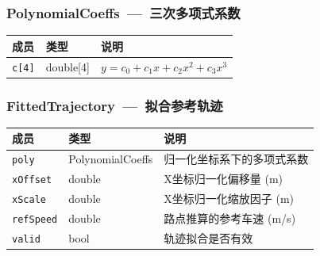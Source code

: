 \documentclass[a4paper,10pt]{article}
\begin{document}
\subsubsection{PolynomialCoeffs~---~三次多项式系数}
\begin{longtable}{|L{3.5cm}|C{2cm}|L{9.5cm}|}
\hline
\textbf{成员} & \textbf{类型} & \textbf{说明} \\
\hline
\texttt{c[4]} & double[4] & $y = c_0 + c_1 x + c_2 x^2 + c_3 x^3$ \\
\hline
\end{longtable}

\subsubsection{FittedTrajectory~---~拟合参考轨迹}
\begin{longtable}{|L{3.5cm}|C{2cm}|L{9.5cm}|}
\hline
\textbf{成员} & \textbf{类型} & \textbf{说明} \\
\hline
\texttt{poly} & PolynomialCoeffs & 归一化坐标系下的多项式系数 \\
\hline
\texttt{xOffset} & double & X坐标归一化偏移量 (m) \\
\hline
\texttt{xScale} & double & X坐标归一化缩放因子 (m) \\
\hline
\texttt{refSpeed} & double & 路点推算的参考车速 (m/s) \\
\hline
\texttt{valid} & bool & 轨迹拟合是否有效 \\
\hline
\end{longtable}
\end{document}
